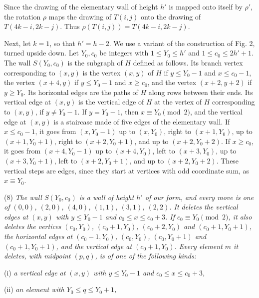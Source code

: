 {Since the drawing of the elementary wall of height $h'$ is mapped onto itself by $\rho'$, the rotation $\rho$ maps the drawing of $T(i, j)$ onto the drawing of $T(4k - i, 2k - j)$. Thus $\rho(T(i, j)) = T(4k - i, 2k - j)$.

Next, let $k = 1$, so that $h' = h - 2$. We use a variant of the construction of Fig. 2, turned upside down. Let $Y_0, c_0$ be integers with $1 \le Y_0 \le h'$ and $1 \le c_0 \le 2h' + 1$. The wall $S(Y_0, c_0)$ is the subgraph of $H$ defined as follows. Its branch vertex corresponding to $(x, y)$ is the vertex $(x, y)$ of $H$ if $y \le Y_0 - 1$ and $x \le c_0 - 1$, the vertex $(x + 4, y)$ if $y \le Y_0 - 1$ and $x \ge c_0$, and the vertex $(x + 2, y + 2)$ if $y \ge Y_0$. Its horizontal edges are the paths of $H$ along rows between their ends. Its vertical edge at $(x, y)$ is the vertical edge of $H$ at the vertex of $H$ corresponding to $(x, y)$, if $y \ne Y_0 - 1$. If $y = Y_0 - 1$, then $x \equiv Y_0 \pmod 2$, and the vertical edge at $(x, y)$ is a staircase made of five edges of the elementary wall. If $x \le c_0 - 1$, it goes from $(x, Y_0 - 1)$ up to $(x, Y_0)$, right to $(x + 1, Y_0)$, up to $(x + 1, Y_0 + 1)$, right to $(x + 2, Y_0 + 1)$, and up to $(x + 2, Y_0 + 2)$. If $x \ge c_0$, it goes from $(x + 4, Y_0 - 1)$ up to $(x + 4, Y_0)$, left to $(x + 3, Y_0)$, up to $(x + 3, Y_0 + 1)$, left to $(x + 2, Y_0 + 1)$, and up to $(x + 2, Y_0 + 2)$. These vertical steps are edges, since they start at vertices with odd coordinate sum, as $x \equiv Y_0$.

\hspace*{12pt}(8) \textit{The wall $S(Y_0, c_0)$ is a wall of height $h'$ of our form, and every move is one of $(0, 0)$, $(2, 0)$, $(4, 0)$, $(1, 1)$, $(3, 1)$, $(2, 2)$. It deletes the vertical edges at $(x, y)$ with $y \le Y_0 - 1$ and $c_0 \le x \le c_0 + 3$. If $c_0 \equiv Y_0 \pmod 2$, it also deletes the vertices $(c_0, Y_0)$, $(c_0 + 1, Y_0)$, $(c_0 + 2, Y_0)$ and $(c_0 + 1, Y_0 + 1)$, the horizontal edges at $(c_0 - 1, Y_0)$, $(c_0, Y_0)$, $(c_0, Y_0 + 1)$ and $(c_0 + 1, Y_0 + 1)$, and the vertical edge at $(c_0 + 1, Y_0)$. Every element $m$ it deletes, with midpoint $(p, q)$, is of one of the following kinds:}

\hspace*{12pt}(i) \textit{a vertical edge at $(x, y)$ with $y \le Y_0 - 1$ and $c_0 \le x \le c_0 + 3$,}

\hspace*{12pt}(ii) \textit{an element with $Y_0 \le q \le Y_0 + 1$,}

}
